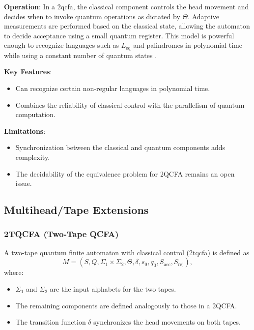 \textbf{Operation}:  
In a \gls{2qcfa}, the classical component controls the head movement and decides when to invoke quantum operations as dictated by \( \Theta \). Adaptive measurements are performed based on the classical state, allowing the automaton to decide acceptance using a small quantum register. This model is powerful enough to recognize languages such as \( L_{\text{eq}} \) and palindromes in polynomial time while using a constant number of quantum states \cite{ambainis2002quantum}.

\textbf{Key Features}:
\begin{itemize}
    \item Can recognize certain non-regular languages in polynomial time.
    \item Combines the reliability of classical control with the parallelism of quantum computation.
\end{itemize}

\textbf{Limitations}:
\begin{itemize}
    \item Synchronization between the classical and quantum components adds complexity.
    \item The decidability of the equivalence problem for 2QCFA remains an open issue.
\end{itemize}

\subsection{Multihead/Tape Extensions}
\label{subsec:multihead-tape}

\subsubsection{2TQCFA (Two-Tape QCFA)}
\label{sssec:2tqcfa}
\begin{definition}[2TQCFA]
A two-tape quantum finite automaton with classical control (\gls{2tqcfa}) is defined as 
\[
M = (S, Q, \Sigma_1 \times \Sigma_2, \Theta, \delta, s_0, q_0, S_{\text{acc}}, S_{\text{rej}}),
\]
where:
\begin{itemize}
    \item \( \Sigma_1 \) and \( \Sigma_2 \) are the input alphabets for the two tapes.
    \item The remaining components are defined analogously to those in a 2QCFA.
    \item The transition function \(\delta\) synchronizes the head movements on both tapes.
\end{itemize}
\end{definition}

